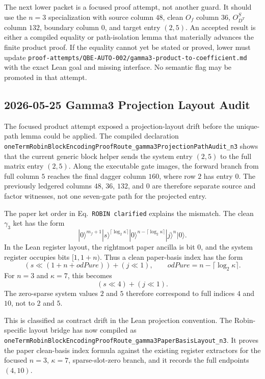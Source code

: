 The next lower packet is a focused proof attempt, not another guard.  It
should use the \(n=3\) specialization with source column \(48\), clean
\(O_f\) column \(36\), \(O_{D^T}^{S}\) column \(132\), boundary column \(0\),
and target entry \((2,5)\).  An accepted result is either a compiled equality
or path-isolation lemma that materially advances the finite product proof.  If
the equality cannot yet be stated or proved, lower must update
\texttt{proof-attempts/QBE-AUTO-002/gamma3-product-to-coefficient.md} with the
exact Lean goal and missing interface.  No semantic flag may be promoted in
that attempt.

\subsection{2026-05-25 Gamma3 Projection Layout Audit}

The focused product attempt exposed a projection-layout drift before the
unique-path lemma could be applied.  The compiled declaration
\texttt{oneTermRobinBlockEncodingProofRoute\_gamma3ProjectionPathAudit\_n3}
shows that the current generic block helper sends the system entry
\((2,5)\) to the full matrix entry \((2,5)\).  Along the executable gate
images, the forward branch from full column \(5\) reaches the final dagger
column \(160\), where row \(2\) has entry \(0\).  The previously ledgered
columns \(48\), \(36\), \(132\), and \(0\) are therefore separate source and
factor witnesses, not one seven-gate path for the projected entry.

The paper ket order in Eq.~\texttt{ROBIN clarified} explains the mismatch.
The clean \(\gamma_3\) ket has the form
\[
  |0\rangle^{m_f+1}|s\rangle^{\lceil\log_2\kappa\rceil}
  |0\rangle^{n-\lceil\log_2\kappa\rceil}|j\rangle^n|0\rangle .
\]
In the Lean register layout, the rightmost paper ancilla is bit \(0\), and
the system register occupies bits \([1,1+n)\).  Thus a clean paper-basis index
has the form
\[
  (s \ll (1+n+odPure)) + (j \ll 1),
  \qquad odPure=n-\lceil\log_2\kappa\rceil .
\]
For \(n=3\) and \(\kappa=7\), this becomes
\[
  (s \ll 4) + (j \ll 1).
\]
The zero-sparse system values \(2\) and \(5\) therefore correspond to full
indices \(4\) and \(10\), not to \(2\) and \(5\).

This is classified as contract drift in the Lean projection convention.  The
Robin-specific layout bridge has now compiled as
\texttt{oneTermRobinBlockEncodingProofRoute\_gamma3PaperBasisLayout\_n3}.  It
proves the paper clean-basis index formula against the existing register
extractors for the focused \(n=3\), \(\kappa=7\), sparse-slot-zero branch, and
it records the full endpoints \((4,10)\).

